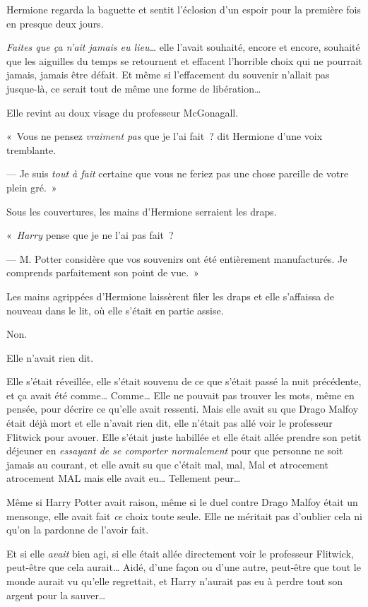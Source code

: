 Hermione regarda la baguette et sentit l'éclosion d'un espoir pour la première fois en presque deux jours.

\emph{Faites que ça n'ait jamais eu lieu…} elle l'avait souhaité, encore et encore, souhaité que les aiguilles du temps se retournent et effacent l'horrible choix qui ne pourrait jamais, jamais être défait. Et même si l'effacement du souvenir n'allait pas jusque-là, ce serait tout de même une forme de libération…

Elle revint au doux visage du professeur McGonagall.

«~Vous ne pensez \emph{vraiment pas} que je l'ai fait~? dit Hermione d'une voix tremblante.

--- Je suis \emph{tout à fait} certaine que vous ne feriez pas une chose pareille de votre plein gré.~»

Sous les couvertures, les mains d'Hermione serraient les draps.

«~\emph{Harry} pense que je ne l'ai pas fait~?

--- M. Potter considère que vos souvenirs ont été entièrement manufacturés. Je comprends parfaitement son point de vue.~»

Les mains agrippées d'Hermione laissèrent filer les draps et elle s'affaissa de nouveau dans le lit, où elle s'était en partie assise.

Non.

Elle n'avait rien dit.

Elle s'était réveillée, elle s'était souvenu de ce que s'était passé la nuit précédente, et ça avait été comme… Comme… Elle ne pouvait pas trouver les mots, même en pensée, pour décrire ce qu'elle avait ressenti. Mais elle avait su que Drago Malfoy était déjà mort et elle n'avait rien dit, elle n'était pas allé voir le professeur Flitwick pour avouer. Elle s'était juste habillée et elle était allée prendre son petit déjeuner en \emph{essayant de se comporter normalement} pour que personne ne soit jamais au courant, et elle avait su que c'était mal, mal, Mal et atrocement atrocement MAL mais elle avait eu… Tellement peur…

Même si Harry Potter avait raison, même si le duel contre Drago Malfoy était un mensonge, elle avait fait \emph{ce} choix toute seule. Elle ne méritait pas d'oublier cela ni qu'on la pardonne de l'avoir fait.

Et si elle \emph{avait} bien agi, si elle était allée directement voir le professeur Flitwick, peut-être que cela aurait… Aidé, d'une façon ou d'une autre, peut-être que tout le monde aurait vu qu'elle regrettait, et Harry n'aurait pas eu à perdre tout son argent pour la sauver…


